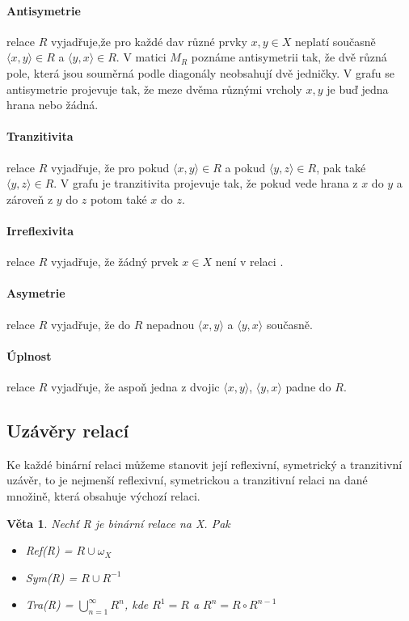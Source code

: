 \documentclass[12pt,a4paper]{article}
\newtheorem{sentence}{Věta}
\begin{document}
\paragraph{Antisymetrie} relace $R$ vyjadřuje,že pro každé dav různé prvky $x,y \in X$ neplatí současně $\langle x, y \rangle \in R$ a  $\langle y, x \rangle \in R$. V matici $M_R$ poznáme antisymetrii tak, že dvě různá pole, která jsou souměrná podle diagonály neobsahují dvě jedničky. V grafu se antisymetrie projevuje tak, že meze dvěma různými vrcholy $x,y$ je buď jedna hrana nebo žádná.

\paragraph{Tranzitivita} relace $R$ vyjadřuje, že pro pokud $\langle x, y \rangle \in R$ a pokud $\langle y, z \rangle \in R$, pak také $\langle y, z \rangle \in R$. V grafu je tranzitivita projevuje tak, že pokud vede hrana z $x$ do $y$ a zároveň z $y$ do $z$ potom také $x$ do $z$.

\paragraph{Irreflexivita} relace $R$  vyjadřuje, že žádný prvek $x \in X$ není v relaci .
\paragraph{Asymetrie} relace $R$  vyjadřuje, že do $R$ nepadnou $\langle x, y \rangle$ a  $\langle y, x \rangle$ současně.
\paragraph{Úplnost} relace $R$  vyjadřuje, že aspoň jedna z dvojic $\langle x, y \rangle$, $\langle y, x \rangle$ padne do $R$.

\subsection{Uzávěry relací}
Ke každé binární relaci můžeme stanovit její reflexivní, symetrický a tranzitivní uzávěr, to je nejmenší reflexivní, symetrickou a tranzitivní relaci na dané množině, která obsahuje výchozí relaci.

\begin{sentence}
	Nechť R je binární relace na X. Pak
	\begin{itemize}
		\item Ref(R) = $R \cup \omega_X$
		\item Sym(R) = $R \cup R^{-1}$
		\item Tra(R) = $\bigcup^\infty_{n=1} R^n$, kde $R^1 = R$ a $R^n = R \circ R^{n-1}$
	\end{itemize}
\end{sentence}
\end{document}
